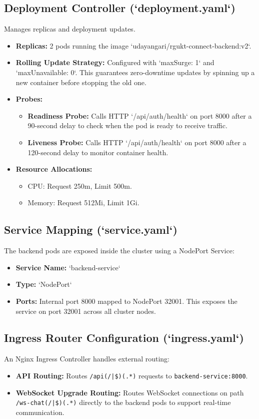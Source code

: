 \subsection{Deployment Controller (`deployment.yaml`)}
Manages replicas and deployment updates.
\begin{itemize}
    \item \textbf{Replicas:} 2 pods running the image `udayangari/rgukt-connect-backend:v2`.
    \item \textbf{Rolling Update Strategy:} Configured with `maxSurge: 1` and `maxUnavailable: 0`. This guarantees zero-downtime updates by spinning up a new container before stopping the old one.
    \item \textbf{Probes:}
    \begin{itemize}
        \item \textbf{Readiness Probe:} Calls HTTP `/api/auth/health` on port 8000 after a 90-second delay to check when the pod is ready to receive traffic.
        \item \textbf{Liveness Probe:} Calls HTTP `/api/auth/health` on port 8000 after a 120-second delay to monitor container health.
    \end{itemize}
    \item \textbf{Resource Allocations:}
    \begin{itemize}
        \item CPU: Request 250m, Limit 500m.
        \item Memory: Request 512Mi, Limit 1Gi.
    \end{itemize}
\end{itemize}

\subsection{Service Mapping (`service.yaml`)}
The backend pods are exposed inside the cluster using a NodePort Service:
\begin{itemize}
    \item \textbf{Service Name:} `backend-service`
    \item \textbf{Type:} `NodePort`
    \item \textbf{Ports:} Internal port 8000 mapped to NodePort 32001. This exposes the service on port 32001 across all cluster nodes.
\end{itemize}

\subsection{Ingress Router Configuration (`ingress.yaml`)}
An Nginx Ingress Controller handles external routing:
\begin{itemize}
    \item \textbf{API Routing:} Routes \texttt{/api(/|\$)(.*)} requests to \texttt{backend-service:8000}.
    \item \textbf{WebSocket Upgrade Routing:} Routes WebSocket connections on path \texttt{/ws-chat(/|\$)(.*)} directly to the backend pods to support real-time communication.
\end{itemize}

